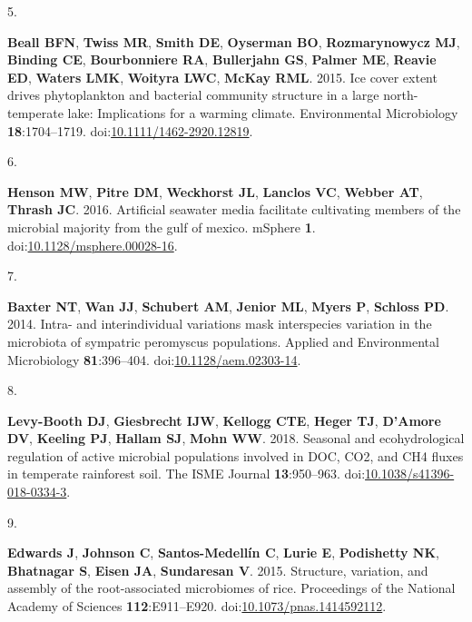 \documentclass[
]{article}
\newlength{\cslhangindent}
\newlength{\csllabelwidth}
\newlength{\cslentryspacingunit} %
\newenvironment{CSLReferences}[2] %
 {%
  \setlength{\parindent}{0pt}
  \ifodd #1
  \let\oldpar\par
  \def\par{\hangindent=\cslhangindent\oldpar}
  \fi
  \setlength{\parskip}{#2\cslentryspacingunit}
 }%
 {}
\newcommand{\CSLLeftMargin}[1]{\parbox[t]{\csllabelwidth}{#1}}
\newcommand{\CSLRightInline}[1]{\parbox[t]{\linewidth - \csllabelwidth}{#1}\break}
\begin{document}
\begin{CSLReferences}{0}{1}
\leavevmode{}%
\CSLLeftMargin{5. }%
\CSLRightInline{\textbf{Beall BFN}, \textbf{Twiss MR}, \textbf{Smith
DE}, \textbf{Oyserman BO}, \textbf{Rozmarynowycz MJ}, \textbf{Binding
CE}, \textbf{Bourbonniere RA}, \textbf{Bullerjahn GS}, \textbf{Palmer
ME}, \textbf{Reavie ED}, \textbf{Waters LMK}, \textbf{Woityra LWC},
\textbf{McKay RML}. 2015. Ice cover extent drives phytoplankton and
bacterial community structure in a large north-temperate lake:
Implications for a warming climate. Environmental Microbiology
\textbf{18}:1704--1719.
doi:\href{https://doi.org/10.1111/1462-2920.12819}{10.1111/1462-2920.12819}.}

\leavevmode{}%
\CSLLeftMargin{6. }%
\CSLRightInline{\textbf{Henson MW}, \textbf{Pitre DM}, \textbf{Weckhorst
JL}, \textbf{Lanclos VC}, \textbf{Webber AT}, \textbf{Thrash JC}. 2016.
Artificial seawater media facilitate cultivating members of the
microbial majority from the gulf of mexico. {mSphere} \textbf{1}.
doi:\href{https://doi.org/10.1128/msphere.00028-16}{10.1128/msphere.00028-16}.}

\leavevmode{}%
\CSLLeftMargin{7. }%
\CSLRightInline{\textbf{Baxter NT}, \textbf{Wan JJ}, \textbf{Schubert
AM}, \textbf{Jenior ML}, \textbf{Myers P}, \textbf{Schloss PD}. 2014.
Intra- and interindividual variations mask interspecies variation in the
microbiota of sympatric peromyscus populations. Applied and
Environmental Microbiology \textbf{81}:396--404.
doi:\href{https://doi.org/10.1128/aem.02303-14}{10.1128/aem.02303-14}.}

\leavevmode{}%
\CSLLeftMargin{8. }%
\CSLRightInline{\textbf{Levy-Booth DJ}, \textbf{Giesbrecht IJW},
\textbf{Kellogg CTE}, \textbf{Heger TJ}, \textbf{D'Amore DV},
\textbf{Keeling PJ}, \textbf{Hallam SJ}, \textbf{Mohn WW}. 2018.
Seasonal and ecohydrological regulation of active microbial populations
involved in {DOC}, {CO}2, and {CH}4 fluxes in temperate rainforest soil.
The {ISME} Journal \textbf{13}:950--963.
doi:\href{https://doi.org/10.1038/s41396-018-0334-3}{10.1038/s41396-018-0334-3}.}

\leavevmode{}%
\CSLLeftMargin{9. }%
\CSLRightInline{\textbf{Edwards J}, \textbf{Johnson C},
\textbf{Santos-Medellín C}, \textbf{Lurie E}, \textbf{Podishetty NK},
\textbf{Bhatnagar S}, \textbf{Eisen JA}, \textbf{Sundaresan V}. 2015.
Structure, variation, and assembly of the root-associated microbiomes of
rice. Proceedings of the National Academy of Sciences
\textbf{112}:E911--E920.
doi:\href{https://doi.org/10.1073/pnas.1414592112}{10.1073/pnas.1414592112}.}


\end{CSLReferences}
\end{document}
